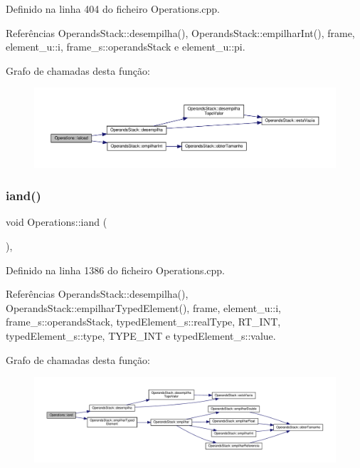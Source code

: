Definido na linha 404 do ficheiro Operations.\+cpp.



Referências Operands\+Stack\+::desempilha(), Operands\+Stack\+::empilhar\+Int(), frame, element\+\_\+u\+::i, frame\+\_\+s\+::operands\+Stack e element\+\_\+u\+::pi.

Grafo de chamadas desta função\+:
\nopagebreak
\begin{figure}[H]
\begin{center}
\leavevmode
\includegraphics[width=350pt]{classOperations_a77f3b4c161fee7fbd6bb89b170400c0c_cgraph}
\end{center}
\end{figure}
\mbox{\label{classOperations_a8761c078ea80677ea82a43ab278e76b5}} 
\subsubsection{\texorpdfstring{iand()}{iand()}}
{\footnotesize\ttfamily void Operations\+::iand (\begin{DoxyParamCaption}{ }\end{DoxyParamCaption})\hspace{0.3cm}{\ttfamily [static]}, {\ttfamily [private]}}



Definido na linha 1386 do ficheiro Operations.\+cpp.



Referências Operands\+Stack\+::desempilha(), Operands\+Stack\+::empilhar\+Typed\+Element(), frame, element\+\_\+u\+::i, frame\+\_\+s\+::operands\+Stack, typed\+Element\+\_\+s\+::real\+Type, R\+T\+\_\+\+I\+NT, typed\+Element\+\_\+s\+::type, T\+Y\+P\+E\+\_\+\+I\+NT e typed\+Element\+\_\+s\+::value.

Grafo de chamadas desta função\+:
\nopagebreak
\begin{figure}[H]
\begin{center}
\leavevmode
\includegraphics[width=350pt]{classOperations_a8761c078ea80677ea82a43ab278e76b5_cgraph}
\end{center}
\end{figure}
\mbox{\label{classOperations_aeec162356a6792b1d0ba385f75f443b1}} 
